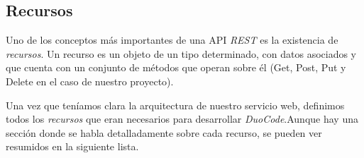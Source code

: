 \subsection{Recursos}

Uno de los conceptos más importantes de una API \textit{REST} es la existencia de \textit{recursos}. Un recurso es un objeto de un tipo determinado, con datos asociados y que cuenta con un conjunto de métodos que operan sobre él (Get, Post, Put y Delete en el caso de nuestro proyecto).

\vspace{1em}

Una vez que teníamos clara la arquitectura de nuestro servicio web, definimos todos los \textit{recursos} que eran necesarios para desarrollar \textit{DuoCode}.Aunque hay una sección donde se habla detalladamente sobre cada recurso,  se pueden ver resumidos en la siguiente lista.

